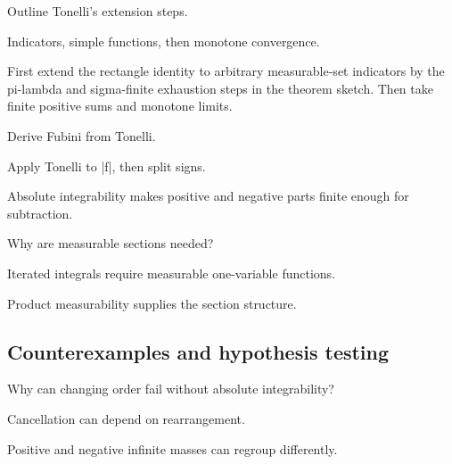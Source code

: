 \begin{exercise}\label{exr:iii05-expand-07}
Outline Tonelli's extension steps.
\end{exercise}
\begin{hint}
Indicators, simple functions, then monotone convergence.
\end{hint}
\begin{solution}
First extend the rectangle identity to arbitrary measurable-set indicators by the pi-lambda and sigma-finite exhaustion steps in the theorem sketch. Then take finite positive sums and monotone limits.
\end{solution}

\begin{exercise}\label{exr:iii05-expand-08}
Derive Fubini from Tonelli.
\end{exercise}
\begin{hint}
Apply Tonelli to |f|, then split signs.
\end{hint}
\begin{solution}
Absolute integrability makes positive and negative parts finite enough for subtraction.
\end{solution}

\begin{exercise}\label{exr:iii05-expand-09}
Why are measurable sections needed?
\end{exercise}
\begin{hint}
Iterated integrals require measurable one-variable functions.
\end{hint}
\begin{solution}
Product measurability supplies the section structure.
\end{solution}

\subsection*{Counterexamples and hypothesis testing}

\begin{exercise}\label{exr:iii05-expand-10}
Why can changing order fail without absolute integrability?
\end{exercise}
\begin{hint}
Cancellation can depend on rearrangement.
\end{hint}
\begin{solution}
Positive and negative infinite masses can regroup differently.
\end{solution}

